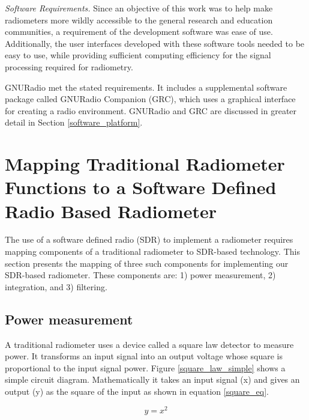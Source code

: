 \emph{Software Requirements.}  Since an objective of this work was to help make radiometers more wildly accessible to the general research and education communities, a requirement of the development software was ease of use.  Additionally, the user interfaces developed with these software tools needed to be easy to use, while providing sufficient computing efficiency for the signal processing required for radiometry.

GNURadio met the stated requirements.  It includes a supplemental software package called GNURadio Companion (GRC), which uses a graphical interface for creating a radio environment.  GNURadio and GRC are discussed in greater detail in Section \ref{software_platform}.


\section{Mapping Traditional Radiometer Functions to a Software Defined Radio Based Radiometer}

The use of a software defined radio (SDR) to implement a radiometer requires mapping components of a traditional radiometer to SDR-based technology.  This section presents the mapping of three such components for implementing our SDR-based radiometer.  These components are:  1) power measurement, 2) integration, and 3) filtering.

\subsection{Power measurement}

A traditional radiometer uses a device called a square law detector to measure power.  It transforms an input signal into an output voltage whose square is proportional to the input signal power.  Figure \ref{square_law_simple} shows a simple circuit diagram.  Mathematically it takes an input signal (x) and gives an output (y) as the square of the input as shown in equation \ref{square_eq}.

\begin{equation}\label{square_eq}
y = x^2
\end{equation}

